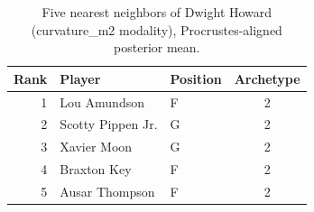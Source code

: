 \begin{table}[htbp]
  \centering\small
  \begin{tabular}{rllc}
    \toprule
    Rank & Player & Position & Archetype \\
    \midrule
    1 & Lou Amundson & F & 2 \\
    2 & Scotty Pippen Jr. & G & 2 \\
    3 & Xavier Moon & G & 2 \\
    4 & Braxton Key & F & 2 \\
    5 & Ausar Thompson & F & 2 \\
    \bottomrule
  \end{tabular}
  \caption{Five nearest neighbors of Dwight Howard (curvature_m2 modality), Procrustes-aligned posterior mean.}
  \label{tab:Dwight_Howard_neighbors_curvature_m2}
\end{table}

